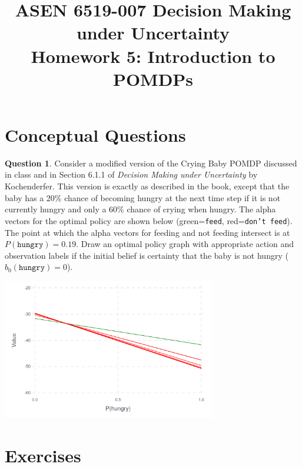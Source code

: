 \documentclass{article}
\title{ASEN 6519-007 Decision Making under Uncertainty\\
       Homework 5: Introduction to POMDPs}
\theoremstyle{definition}
\newtheorem{question}[thm]{Question}
\begin{document}
\maketitle

\section{Conceptual Questions}

\begin{question}
    Consider a modified version of the Crying Baby POMDP discussed in class and in Section 6.1.1 of \emph{Decision Making under Uncertainty} by Kochenderfer. This version is exactly as described in the book, except that the baby has a 20\% chance of becoming hungry at the next time step if it is not currently hungry and only a 60\% chance of crying when hungry. The alpha vectors for the optimal policy are shown below (green=\texttt{feed}, red=\texttt{don't feed}). The point at which the alpha vectors for feeding and not feeding intersect is at $P(\texttt{hungry}) = 0.19$. Draw an optimal policy graph with appropriate action and observation labels if the initial belief is certainty that the baby is not hungry ($b_0(\texttt{hungry}) = 0$).

\begin{center}
    \includegraphics[width=0.7\textwidth]{alphas.png}
\end{center}

\end{question}

\pagebreak

\section{Exercises}
\end{document}
